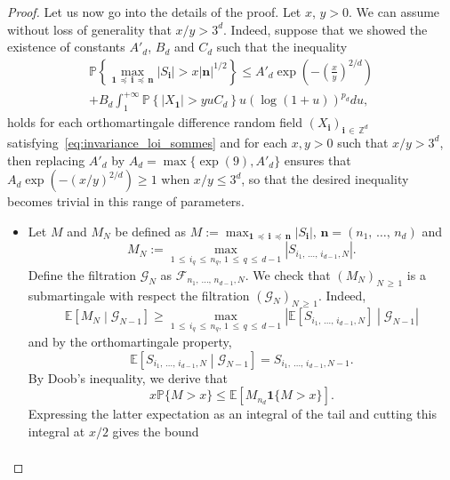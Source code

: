 \documentclass[AHL,Unicode,longabstracts,published]{cedram}
\newcommand{\Fca}{\mathcal{F}}
\newcommand{\Gca}{\mathcal{G}}
\newcommand{\bfun}{\mathbf{1}}
\newcommand\PP{\mathbb{P}}
\newcommand\Z{\mathbb{Z}}
\newcommand{\bbE}{\mathbb{E}}
\newcommand\ens[1]{\{ #1\}}
\newcommand\abs[1]{|#1|}
\newcommand{\pr}[1]{(#1)}
\newcommand{\gr}[1]{\bm{#1}}
\newcommand{\gri}{\bm{i}}
\newcommand{\grn}{\bm{n}}
\newcommand{\imd}{\preccurlyeq}
\begin{document}
\begin{proof}
Let us now go into the details of the proof. Let $x$, $y>0$. We can assume without loss of generality that $x/y>3^d$. Indeed, suppose that we showed the existence of constants $A'_d$, $B_d$ and $C_d$ such that the inequality
\begin{multline}
\PP\left\{\max_{\gr{1}\,\imd\,\gri\,\imd\,\gr{n} } \left|S_{\gri} \right| >x\left|\grn\right|^{1/2}\right\}\leq A'_d\exp\left(-\left(\frac{x}{y}\right)^{2/d}\right)
\\+B_d\int_1^{+\infty}\PP\left\{\left|X_{\gr{1}}\right|>yuC_d\right\} u\left(\log\pr{1+u}\right)^{p_d}du,
\end{multline}
holds for each orthomartingale difference random field $\pr{X_{\gri}}_{\gri\,\in\,\Z^d}$ satisfying~\eqref{eq:invariance_loi_sommes} and for each $x,y>0$ such that $x/y>3^d$, then replacing $A'_d$ by $A_d=\max\ens{\exp\pr{9},A'_d}$ ensures that $A_d\exp\pr{-\pr{x/y}^{2/d}}
\geq 1$ when $x/y \leq 3^d$, so that the desired inequality becomes trivial in this range of parameters.
\begin{itemize}
\item[\eqref{step1}] Let $M$ and $M_N$ be defined as $M:=\max_{\gr{1}\,\imd\,\gri\,\imd\,\gr{n}} \abs{S_{\gri} }$, $\grn=\pr{n_1,\,\dots,\,n_d}$ and
\begin{equation}
M_N:=\max_{1\,\leq\,i_q\,\leq\,n_q,\,1\,\leq\,q\,\leq\,d-1}
\left|S_{i_1,\,\dots,\,i_{d-1},N}\right|.
\end{equation}
Define the filtration $\Gca_N$ as $\Fca_{n_1,\,\dots,\,n_{d-1}, N}$. We check that $\pr{M_N}_{N\,\geq\,1}$ is a submartingale with respect the filtration $\pr{\Gca_N}_{N\,\geq\,1}$. Indeed,
\begin{equation}
\bbE\left[M_N\middle| \Gca_{N-1}\right]
\geq \max_{1\,\leq\,i_q\,\leq\,n_q,\,1\,\leq\,q\,\leq\,d-1}
\left|\bbE\left[S_{i_1,\,\dots,\,i_{d-1},N}\right]\middle|\Gca_{N-1} \right|
\end{equation}
and by the orthomartingale property,
\begin{equation}
\bbE\left[S_{i_1,\,\dots,\,i_{d-1},N}\middle|\Gca_{N-1}\right] =S_{i_1,\,\dots,\,i_{d-1},N-1}.
\end{equation}
By Doob's inequality, we derive that
\begin{equation}
x\PP\ens{M>x}\leq \bbE\left[M_{n_d}\bfun\ens{M>x}\right].
\end{equation}
Expressing the latter expectation as an integral of the tail and cutting this integral at $x/2$ gives the bound
\begin{multline}\label{eq:first_step_induction}

\end{multline}
\end{itemize}
\end{proof}
\end{document}
